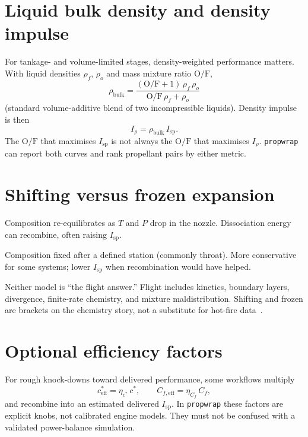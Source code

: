 \documentclass[11pt,a4paper]{report}
\newcommand{\pw}{\texttt{propwrap}}
\newcommand{\of}{\mathrm{O/F}}
\newcommand{\Isp}{I_{\mathrm{sp}}}
\newcommand{\cstar}{c^{*}}
\begin{document}
\section{Liquid bulk density and density impulse}

For tankage- and volume-limited stages, density-weighted performance matters.
With liquid densities $\rho_f$, $\rho_o$ and mass mixture ratio $\of$,
\begin{equation}
  \rho_{\mathrm{bulk}}
  = \frac{(\of+1)\,\rho_f\,\rho_o}{\of\,\rho_f + \rho_o}
  \label{eq:rho_bulk}
\end{equation}
(standard volume-additive blend of two incompressible liquids). Density impulse
is then
\begin{equation}
  I_{\rho} = \rho_{\mathrm{bulk}}\,\Isp.
  \label{eq:density_isp}
\end{equation}
The $\of$ that maximises $\Isp$ is not always the $\of$ that maximises
$I_{\rho}$. \pw{} can report both curves and rank propellant pairs by either
metric.

\section{Shifting versus frozen expansion}

\begin{description}[style=nextline,leftmargin=1.2cm]
  \item[Shifting (equilibrium)] Composition re-equilibrates as $T$ and $P$ drop
        in the nozzle. Dissociation energy can recombine, often raising $\Isp$.
  \item[Frozen] Composition fixed after a defined station (commonly throat).
        More conservative for some systems; lower $\Isp$ when recombination would
        have helped.
\end{description}
Neither model is ``the flight answer.'' Flight includes kinetics, boundary
layers, divergence, finite-rate chemistry, and mixture maldistribution.
Shifting and frozen are brackets on the chemistry story, not a substitute for
hot-fire data~\citep{sutton2017}.

\section{Optional efficiency factors}

For rough knock-downs toward delivered performance, some workflows multiply
\begin{equation}
  \cstar_{\mathrm{eff}} = \eta_{c^{*}}\,\cstar,
  \qquad
  C_{f,\mathrm{eff}} = \eta_{C_f}\,C_f,
  \label{eq:eta}
\end{equation}
and recombine into an estimated delivered $\Isp$. In \pw{} these factors are
explicit knobs, not calibrated engine models. They must not be confused with a
validated power-balance simulation.
\end{document}
